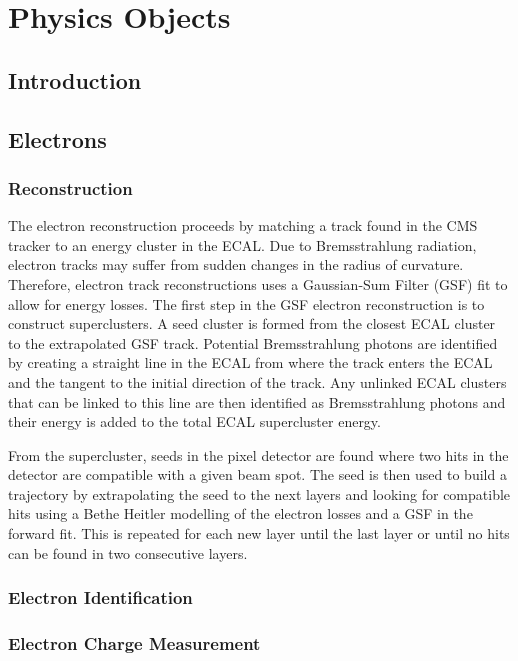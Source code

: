 \chapter{Physics Objects}

\section{Introduction}

\section{Electrons}
\subsection{Reconstruction}
The electron reconstruction proceeds by matching a track found in the CMS
tracker to an energy cluster in the ECAL.
Due to Bremsstrahlung radiation, electron tracks may suffer from sudden changes
in the radius of curvature. 
Therefore, electron track reconstructions uses a Gaussian-Sum Filter (GSF) fit
to allow for energy losses. 
The first step in the GSF electron reconstruction is to construct
superclusters.
A seed cluster is formed from the closest ECAL cluster to the extrapolated GSF
track. 
Potential Bremsstrahlung photons are identified by creating a straight line in
the ECAL from where the track enters the ECAL and the tangent to the initial
direction of the track. 
Any unlinked ECAL clusters that can be linked to this line are then identified
as Bremsstrahlung photons and their energy is added to the total ECAL
supercluster energy.\cite{eleReco}

From the supercluster, seeds in the pixel detector are found where two hits in
the detector are compatible with a given beam spot. The seed is then used to
build a trajectory by extrapolating the seed to the next layers and looking for
compatible hits using a Bethe Heitler modelling of the electron losses and a
GSF in the forward fit. This is repeated for each new layer until the last
layer or until no hits can be found in two consecutive layers.\cite{eleReco}

\subsection{Electron Identification}
\subsection{Electron Charge Measurement}

